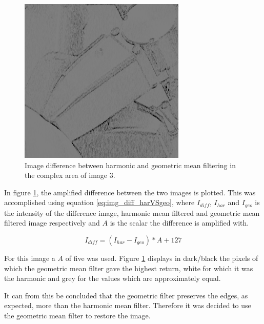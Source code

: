 \begin{figure}[H]
\centering
\includegraphics[width= 0.9 \linewidth]{../code/images/image_harVSgeo_complex_03}
\caption{Image difference between harmonic and geometric mean filtering in the complex area of image 3.}
\label{fig:diff_harVSgeo_im03}
\end{figure}


In figure \ref{fig:diff_harVSgeo_im03}, the amplified difference between the two images is plotted.
This was accomplished using equation \ref{eq:img_diff_harVSgeo}, where $I_{diff}$, $I_{har}$ and $I_{geo}$ is the intensity of the difference image, harmonic mean filtered and geometric mean filtered image respectively and $A$ is the scalar the difference is amplified with.

\begin{equation}
I_{diff} = \left( I_{har} - I_{geo} \right) * A + 127
\label{eq:img_diff_harVSgeo}
\end{equation}

For this image a $A$ of five was used.
Figure \ref{fig:diff_harVSgeo_im03} displays in dark/black the pixels of which the geometric mean filter gave the highest return, white for which it was the harmonic and grey for the values which are approximately equal.

It can from this be concluded that the geometric filter preserves the edges, as expected, more than the harmonic mean filter.
Therefore it was decided to use the geometric mean filter to restore the image.


